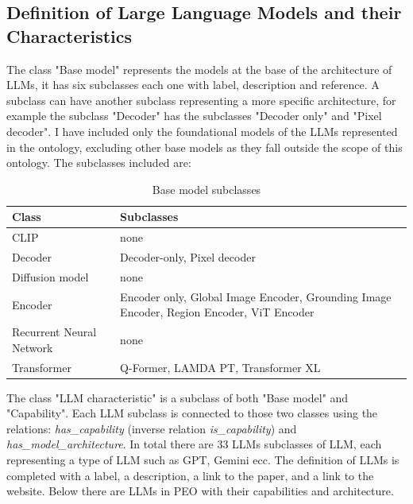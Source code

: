 \subsection{Definition of Large Language Models and their Characteristics}
\label{subsection:4_3_3_llms}
The class "Base model" represents the models at the base of the architecture of LLMs, it has six subclasses each one with label, description and reference.
A subclass can have another subclass representing a more specific architecture, for example the subclass "Decoder" has the subclasses "Decoder only" and "Pixel decoder". 
I have included only the foundational models of the LLMs represented in the ontology, excluding other base models as they fall outside the scope of this ontology.
The subclasses included are: 
\begin{table}[H]
    \centering
    \begin{tabular}{|>{\raggedright\arraybackslash}p{6cm}|>{\raggedright\arraybackslash}p{6cm}|}
        \hline
        \textbf{Class} & \textbf{Subclasses} \\ \hline
         CLIP & none \\ \hline
         
         Decoder & Decoder-only, Pixel decoder \\ \hline
         
         Diffusion model & none \\ \hline
         
         Encoder & Encoder only, Global Image Encoder, Grounding Image Encoder, Region Encoder, ViT Encoder \\ \hline
         
         Recurrent Neural Network & none \\ \hline

        Transformer & Q-Former, LAMDA PT, Transformer XL \\ \hline
    \end{tabular}
    \caption{Base model subclasses}
\end{table}
The class "LLM characteristic" is a subclass of both "Base model" and "Capability".
Each LLM subclass is connected to those two classes using the relations: \textit{has\_capability} (inverse relation \textit{is\_capability}) and \textit{has\_model\_architecture}.
In total there are 33 LLMs subclasses of LLM, each representing a type of LLM such as GPT, Gemini ecc.
The definition of LLMs is completed with a label, a description, a link to the paper, and a link to the website.
Below there are LLMs in PEO with their capabilities and architecture.

